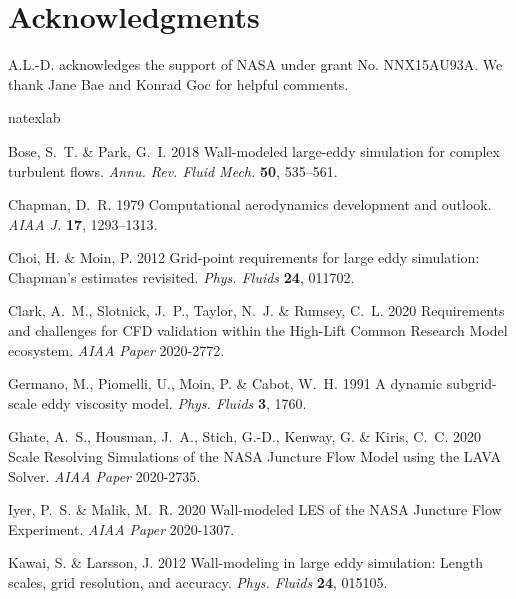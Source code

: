 \documentclass{ctr}
\begin{document}
\section*{Acknowledgments}

A.L.-D. acknowledges the support of NASA under grant
No. NNX15AU93A. We thank Jane Bae and Konrad Goc for helpful comments.

%


\begin{thebibliography}{28}
\expandafter\ifx\csname natexlab\endcsname\relax\def\natexlab#1{#1}\fi

{\sc Bose, S.~T. \& Park, G.~I.} 2018 Wall-modeled large-eddy simulation for
  complex turbulent flows. {\em Annu. Rev. Fluid Mech.\/} {\bf 50}, 535--561.

{\sc Chapman, D.~R.} 1979 {Computational aerodynamics development and outlook}.
  {\em AIAA J.\/} {\bf 17}, 1293--1313.

{\sc Choi, H. \& Moin, P.} 2012 Grid-point requirements for large eddy
  simulation: Chapman's estimates revisited. {\em Phys. Fluids\/} {\bf 24},
  011702.

  {\sc Clark, A.~M., Slotnick, J.~P., Taylor, N.~J. \& Rumsey, C.~L.} 2020
   {Requirements and challenges for CFD validation within the High-Lift Common
  Research Model ecosystem}. {\em AIAA Paper\/} 2020-2772.
  
{\sc Germano, M., Piomelli, U., Moin, P. \& Cabot, W.~H.} 1991 {A dynamic
  subgrid-scale eddy viscosity model}. {\em Phys. Fluids\/} {\bf 3},
  1760.

{\sc Ghate, A.~S., Housman, J.~A., Stich, G.-D., Kenway, G. \& Kiris, C.~C.}
  2020 {Scale Resolving Simulations of the NASA Juncture Flow Model using the
  LAVA Solver}. {\em AIAA Paper\/} 2020-2735.

{\sc Iyer, P.~S. \& Malik, M.~R.} 2020 {Wall-modeled LES of the NASA Juncture
  Flow Experiment}. {\em AIAA Paper\/} 2020-1307.

{\sc Kawai, S. \& Larsson, J.} 2012 {Wall-modeling in large eddy simulation:
  Length scales, grid resolution, and accuracy}. {\em Phys. Fluids\/} {\bf 24}, 015105.


\end{thebibliography}
\end{document}
